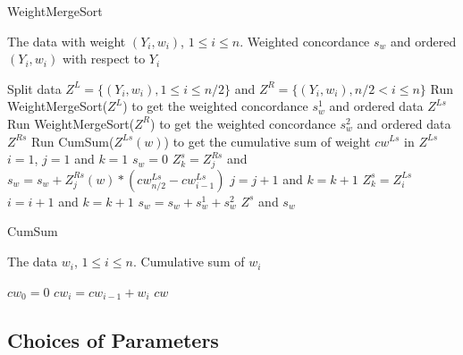 \documentclass[10pt,twocolumn,twoside]{IEEEtran}
\begin{document}
\begin{algorithm}[h!]
\caption{WeightMergeSort}
\label{ag:fasttau}
\begin{algorithmic}
\REQUIRE The data with weight $(Y_i,w_i)$, $1\le i\le n$.
\ENSURE Weighted concordance $s_w$ and ordered $(Y_i,w_i)$ with respect to $Y_i$

\STATE Split data $Z^{L}=\{(Y_i,w_i),1\le i\le n/2\}$ and $Z^{R}=\{(Y_i,w_i),n/2< i\le n\}$
\STATE Run WeightMergeSort($Z^L$) to get the weighted concordance $s_w^1$ and ordered data $Z^{Ls}$
\STATE Run WeightMergeSort($Z^R$) to get the weighted concordance $s_w^2$ and ordered data $Z^{Rs}$
\STATE Run CumSum($Z^{Ls}(w)$) to get the cumulative sum of weight $cw^{Ls}$ in $Z^{Ls}$
\STATE $i=1$, $j=1$ and $k=1$ 
\STATE $s_w=0$
\STATE $Z^s_k=Z^{Rs}_j$ and $s_w=s_w+Z^{Rs}_j(w)*(cw^{Ls}_{n/2}-cw^{Ls}_{i-1})$
\STATE $j=j+1$ and $k=k+1$
\ELSE
\STATE $Z^s_k=Z^{Ls}_i$
\STATE $i=i+1$ and $k=k+1$
\ENDIF
\ENDWHILE
\STATE $s_w=s_w+s_w^1+s_w^2$
\RETURN $Z^s$ and $s_w$
\end{algorithmic}
\end{algorithm}

\begin{algorithm}[h!]
\caption{CumSum}
\label{ag:cumsum}
\begin{algorithmic}
\REQUIRE The data $w_i$, $1\le i\le n$.
\ENSURE Cumulative sum of $w_i$

\STATE $cw_0=0$
\STATE $cw_i=cw_{i-1}+w_i$
\ENDFOR
\RETURN $cw$
\end{algorithmic}
\end{algorithm}

\subsection{Choices of Parameters}
\label{sc:paramter}
\end{document}
